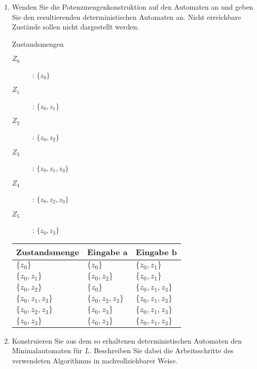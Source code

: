 \documentclass{lehramt-informatik-aufgabe}
\begin{document}
\begin{enumerate}
\item Wenden Sie die Potenzmengenkonstruktion auf den Automaten an und
geben Sie den resultierenden deterministischen Automaten an. Nicht
erreichbare Zustände sollen nicht dargestellt werden.

\begin{liAntwort}

Zustandsmengen

\begin{description}
\item[$Z_0$]: $\{z_0 \}$
\item[$Z_1$]: $\{z_0, z_1 \}$
\item[$Z_2$]: $\{z_0, z_2 \}$
\item[$Z_3$]: $\{z_0, z_1, z_3 \}$
\item[$Z_4$]: $\{z_0, z_2, z_3 \}$
\item[$Z_5$]: $\{z_0, z_3 \}$
\end{description}

\begin{tabular}{l|l|l}

Zustandsmenge & Eingabe a & Eingabe b \\\hline

$\{z_0 \}$ & $\{z_0 \}$ & $\{z_0, z_1 \}$ \\

$\{z_0, z_1 \}$ & $\{z_0, z_2 \}$ & $\{z_0, z_1 \}$ \\

$\{z_0, z_2 \}$ & $\{z_0 \}$ & $\{z_0, z_1, z_3 \}$ \\

$\{z_0, z_1, z_3 \}$ & $\{z_0, z_2, z_3 \}$ & $\{z_0, z_1, z_3 \}$ \\

$\{z_0, z_2, z_3 \}$ & $\{z_0, z_3 \}$ &  $\{z_0, z_1, z_3 \}$ \\

$\{z_0, z_3 \}$ & $\{z_0, z_3 \}$ & $\{z_0, z_1, z_3 \}$\\
\end{tabular}
\end{liAntwort}

\item Konstruieren Sie aus dem so erhaltenen deterministischen Automaten
den Minimalautomaten für $L$. Beschreiben Sie dabei die Arbeitsschritte
des verwendeten Algorithmus in nachvollziehbarer Weise.
\end{enumerate}
\end{document}

